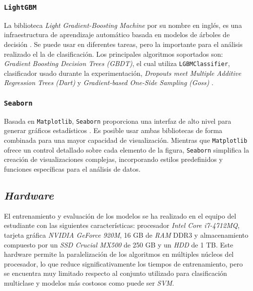 \subsubsection{\texttt{LightGBM}}
\label{subsubsec:lightgbm}

La biblioteca \textit{Light Gradient-Boosting Machine} por su nombre en inglés, es una infraestructura de aprendizaje automático basada en modelos de árboles de decisión \cite{lgbm}. Se puede usar en diferentes tareas, pero la importante para el análisis realizado el la de clasificación. Los principales algoritmos soportados son: \textit{Gradient Boosting Decision Trees (GBDT)}, el cual utiliza \texttt{LGBMClassifier}, clasificador usado durante la experimentación, \textit{Dropouts meet Multiple Additive Regression Trees (Dart)} y \textit{Gradient-based One-Side Sampling (Goss)} \cite{lgbm_alg}.

\newpage
\subsubsection{\texttt{Seaborn}}
\label{subsubsec:seaborn}

Basada en \texttt{Matplotlib}, \texttt{Seaborn} proporciona una interfaz de alto nivel para generar gráficos estadísticos \cite{seaborn}. Es posible usar ambas bibliotecas de forma combinada para una mayor capacidad de visualización. Mientras que \texttt{Matplotlib} ofrece un control detallado sobre cada elemento de la figura, \texttt{Seaborn} simplifica la creación de visualizaciones complejas, incorporando estilos predefinidos y funciones específicas para el análisis de datos.

\subsection{\textit{Hardware}}
\label{subsec:hw_usado}

El entrenamiento y evaluación de los modelos se ha realizado en el equipo del estudiante con las siguientes características: procesador \textit{Intel Core i7-4712MQ}, tarjeta gráfica \textit{NVIDIA GeForce 920M}, 16 GB de \textit{RAM} DDR3 y almacenamiento compuesto por un \textit{SSD Crucial MX500} de 250 GB y un \textit{HDD} de 1 TB. Este hardware permite la paralelización de los algoritmos en múltiples núcleos del procesador, lo que reduce significativamente los tiempos de entrenamiento, pero se encuentra muy limitado respecto al conjunto utilizado para clasificación multiclase y modelos más costosos como puede ser \textit{SVM}.

